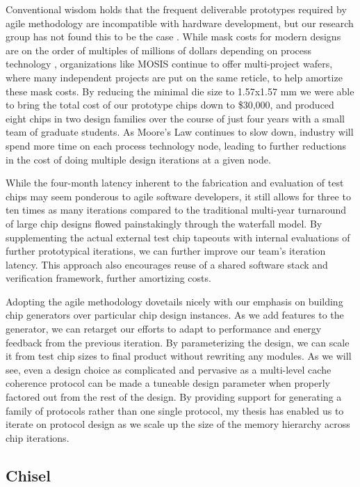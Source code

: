 Conventional wisdom holds that the frequent deliverable prototypes required by agile methodology are incompatible with hardware development, but our research group has not found this to be the case \cite{patterson-eetimes}.
While mask costs for modern designs are on the order of multiples of millions of dollars depending on process technology \cite{sperling}, 
organizations like MOSIS continue to offer multi-project wafers, where many independent projects are put on the same reticle, to help amortize these mask costs.
By reducing the minimal die size to 1.57x1.57 mm we were able to bring the total cost of our prototype chips down to \$30,000,
and produced eight chips in two design families over the course of just four years with a small team of graduate students.
As Moore's Law continues to slow down, industry will spend more time on each process technology node, leading to further reductions in the cost of doing multiple design iterations at a given node.

While the four-month latency inherent to the fabrication and evaluation of test chips may seem ponderous to agile software developers,
it still allows for three to ten times as many iterations compared to the traditional  multi-year turnaround of large chip designs flowed painstakingly through the waterfall model.
By supplementing the actual external test chip tapeouts with internal evaluations of further prototypical iterations, we can further improve our team's iteration latency.
This approach also encourages reuse of a shared software stack and verification framework, further amortizing costs.

Adopting the agile methodology dovetails nicely with our emphasis on building chip generators over particular chip design instances.
As we add features to the generator, we can retarget our efforts to adapt to performance and energy feedback from the previous iteration.
By parameterizing the design, we can scale it from test chip sizes to final product without rewriting any modules.
As we will see, even a design choice as complicated and pervasive as a multi-level cache coherence protocol can be made a tuneable design parameter when properly factored out from the rest of the design.
By providing support for generating a family of protocols rather than one single protocol, my thesis has enabled us to iterate on protocol design as we scale up the size of the memory hierarchy across chip iterations.

\subsection{Chisel}

